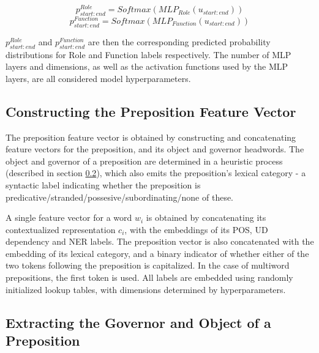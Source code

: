$$ p^{Role}_{start:end} = Softmax(MLP_{Role}(u_{start:end})) $$
$$ p^{Function}_{start:end} = Softmax(MLP_{Function}(u_{start:end})) $$

$p^{Role}_{start:end}$ and $p^{Function}_{start:end}$ are then the corresponding predicted probability distributions for Role and Function labels respectively. The number of MLP layers and dimensions, as well as the activation functions used by the MLP layers, are all considered model hyperparameters. 

\subsection{Constructing the Preposition Feature Vector} \label{sec:enrichedvec}
The preposition feature vector is obtained by constructing and concatenating feature vectors for the preposition, and its object and governor headwords. The object and governor of a preposition are determined in a heuristic process (described in section \ref{sec:govobj}), which also emits the preposition's lexical category - a syntactic label indicating whether the preposition is
predicative/stranded/possesive/subordinating/none of these. 

A single feature vector for a word $w_i$ is obtained by concatenating its contextualized representation $c_i$, with the embeddings of its POS, UD dependency and NER labels. The preposition vector is also concatenated with the embedding of its lexical category, and a binary indicator of whether either of the two tokens following the preposition is capitalized. In the case of multiword prepositions, the first token is used. All labels are embedded using randomly initialized lookup tables, with dimensions determined by hyperparameters.

\subsection{Extracting the Governor and Object of a Preposition} \label{sec:govobj}

